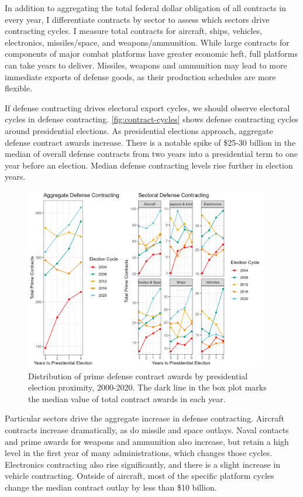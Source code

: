\documentclass[12pt]{article}
\begin{document}
In addition to aggregating the total federal dollar obligation of all contracts in every year, I differentiate contracts by sector to assess which sectors drive contracting cycles. 
I measure total contracts for aircraft, ships, vehicles, electronics, missiles/space, and weapons/ammunition. 
While large contracts for components of major combat platforms have greater economic heft, full platforms can take years to deliver. 
Missiles, weapons and ammunition may lead to more immediate exports of defense goods, as their production schedules are more flexible.


If defense contracting drives electoral export cycles, we should observe electoral cycles in defense contracting.
\autoref{fig:contract-cycles} shows defense contracting cycles around presidential elections. 
As presidential elections approach, aggregate defense contract awards increase. 
There is a notable spike of \$25-30 billion in the median of overall defense contracts from two years into a presidential term to one year before an election. 
Median defense contracting levels rise further in election years.


\begin{figure}[htpb]
	\centering
		\includegraphics[width=0.95\textwidth]{../figures/contract-cycles.png}
	\caption{Distribution of prime defense contract awards by presidential election proximity, 2000-2020. The dark line in the box plot marks the median value of total contract awards in each year.}
	\label{fig:contract-cycles}
\end{figure}


Particular sectors drive the aggregate increase in defense contracting. 
Aircraft contracts increase dramatically, as do missile and space outlays. 
Naval contacts and prime awards for weapons and ammunition also increase, but retain a high level in the first year of many administrations, which changes those cycles. 
Electronics contracting also rise significantly, and there is a slight increase in vehicle contracting. 
Outside of aircraft, most of the specific platform cycles change the median contract outlay by less than \$10 billion.
\end{document}
